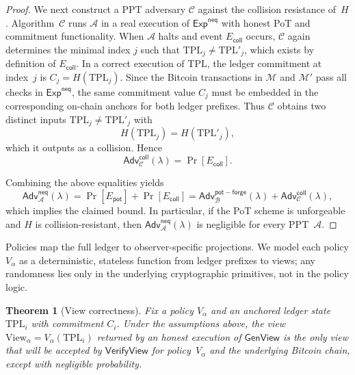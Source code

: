 \documentclass[11pt]{article}
\newtheorem{theorem}{Theorem}
\begin{document}
\begin{proof}
We next construct a PPT adversary $\mathcal{C}$ against the collision
resistance of~$H$.
Algorithm~$\mathcal{C}$ runs $\mathcal{A}$ in a real execution of
$\mathsf{Exp}^{\mathsf{neq}}$ with honest PoT and commitment functionality.
When $\mathcal{A}$ halts and event $E_{\mathsf{coll}}$ occurs,
$\mathcal{C}$ again determines the minimal index $j$ such that
$\mathrm{TPL}_j \neq \mathrm{TPL}'_j$, which exists by definition of
$E_{\mathsf{coll}}$.
In a correct execution of TPL, the ledger commitment at index~$j$ is
$C_j = H(\mathrm{TPL}_j)$.
Since the Bitcoin transactions in $\mathcal{M}$ and $\mathcal{M}'$ pass all
checks in $\mathsf{Exp}^{\mathsf{neq}}$, the same commitment value $C_j$
must be embedded in the corresponding on-chain anchors for both ledger
prefixes.
Thus $\mathcal{C}$ obtains two distinct inputs $\mathrm{TPL}_j \neq
\mathrm{TPL}'_j$ with
\[
  H(\mathrm{TPL}_j) = H(\mathrm{TPL}'_j),
\]
which it outputs as a collision.
Hence
\[
  \mathsf{Adv}^{\mathsf{coll}}_{\mathcal{C}}(\lambda)
  = \Pr[E_{\mathsf{coll}}].
\]

Combining the above equalities yields
\[
  \mathsf{Adv}^{\mathsf{neq}}_{\mathcal{A}}(\lambda)
  = \Pr[E_{\mathsf{pot}}] + \Pr[E_{\mathsf{coll}}]
  = \mathsf{Adv}^{\mathsf{pot-forge}}_{\mathcal{B}}(\lambda)
    + \mathsf{Adv}^{\mathsf{coll}}_{\mathcal{C}}(\lambda),
\]
which implies the claimed bound.
In particular, if the PoT scheme is unforgeable and $H$ is
collision-resistant, then $\mathsf{Adv}^{\mathsf{neq}}_{\mathcal{A}}(\lambda)$
is negligible for every PPT~$\mathcal{A}$.
\end{proof}
Policies map the full ledger to observer-specific projections. We model each policy $V_\alpha$ as a deterministic, stateless function from ledger prefixes to views; any randomness lies only in the underlying cryptographic primitives, not in the policy logic.

\begin{theorem}[View correctness]
\label{thm:view-correctness}
Fix a policy $V_\alpha$ and an anchored ledger state
$\mathrm{TPL}_i$ with commitment $C_i$.
Under the assumptions above, the view $\mathrm{View}_\alpha = V_\alpha(\mathrm{TPL}_i)$
returned by an honest execution of $\mathsf{GenView}$ is the \emph{only} view
that will be accepted by $\mathsf{VerifyView}$ for policy~$V_\alpha$ and the
underlying Bitcoin chain, except with negligible probability.
\end{theorem}
\end{document}
